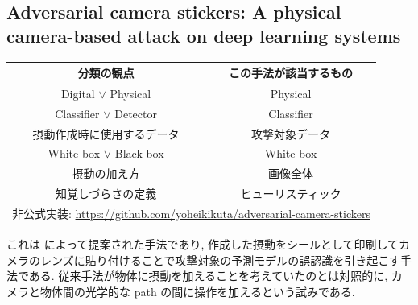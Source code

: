 \subsection{Adversarial camera stickers: A physical camera-based attack on deep learning systems}
\label{subsec:advdersarial-camera}
%
\begin{table}[htbp]
\begin{center}
\begin{tabular}{|c|c|}
\hline
分類の観点 & この手法が該当するもの \\
\hline
Digital $\lor$ Physical & Physical \\
Classifier $\lor$ Detector & Classifier \\
摂動作成時に使用するデータ & 攻撃対象データ \\
White box $\lor$ Black box & White box \\
摂動の加え方 & 画像全体 \\
知覚しづらさの定義 & ヒューリスティック \\
\hline
\multicolumn{2}{|c|}{非公式実装: \href{https://github.com/yoheikikuta/adversarial-camera-stickers}{https://github.com/yoheikikuta/adversarial-camera-stickers}} \\
\hline
\end{tabular}
\label{tb:advdersarial-camera-summary}
\end{center}
\end{table}
%

これは \cite{li2019adversarial} によって提案された手法であり, 作成した摂動をシールとして印刷してカメラのレンズに貼り付けることで攻撃対象の予測モデルの誤認識を引き起こす手法である.
従来手法が物体に摂動を加えることを考えていたのとは対照的に, カメラと物体間の光学的な path の間に操作を加えるという試みである.

